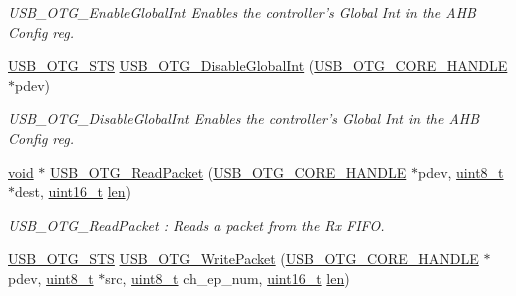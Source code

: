 \begin{DoxyCompactItemize}
\begin{DoxyCompactList}\small\item\em U\-S\-B\-\_\-\-O\-T\-G\-\_\-\-Enable\-Global\-Int Enables the controller's Global Int in the A\-H\-B Config reg. \end{DoxyCompactList}\item 
\hyperlink{group___u_s_b___c_o_r_e___exported___types_ga8b6504b9af0662f17515795db0f9c8ed}{U\-S\-B\-\_\-\-O\-T\-G\-\_\-\-S\-T\-S} \hyperlink{group___u_s_b___c_o_r_e___exported___functions_prototype_gaceb188e956d5f85d3e2ce0b8e735f613}{U\-S\-B\-\_\-\-O\-T\-G\-\_\-\-Disable\-Global\-Int} (\hyperlink{group___u_s_b___c_o_r_e___exported___types_gaf76054c11eb8a3367907aad7ae700e80}{U\-S\-B\-\_\-\-O\-T\-G\-\_\-\-C\-O\-R\-E\-\_\-\-H\-A\-N\-D\-L\-E} $\ast$pdev)
\begin{DoxyCompactList}\small\item\em U\-S\-B\-\_\-\-O\-T\-G\-\_\-\-Disable\-Global\-Int Enables the controller's Global Int in the A\-H\-B Config reg. \end{DoxyCompactList}\item 
\hyperlink{group___n_a_m_e_ga18028b8badbf1ea7e704ccac3c488e82}{void} $\ast$ \hyperlink{group___u_s_b___c_o_r_e___exported___functions_prototype_gaf79fc30f972ad9edfbd74fff2d12e759}{U\-S\-B\-\_\-\-O\-T\-G\-\_\-\-Read\-Packet} (\hyperlink{group___u_s_b___c_o_r_e___exported___types_gaf76054c11eb8a3367907aad7ae700e80}{U\-S\-B\-\_\-\-O\-T\-G\-\_\-\-C\-O\-R\-E\-\_\-\-H\-A\-N\-D\-L\-E} $\ast$pdev, \hyperlink{stdint_8h_aba7bc1797add20fe3efdf37ced1182c5}{uint8\-\_\-t} $\ast$dest, \hyperlink{stdint_8h_a273cf69d639a59973b6019625df33e30}{uint16\-\_\-t} \hyperlink{mavlink__helpers_8h_aba59486c1504340293255a065b546e3a}{len})
\begin{DoxyCompactList}\small\item\em U\-S\-B\-\_\-\-O\-T\-G\-\_\-\-Read\-Packet \-: Reads a packet from the Rx F\-I\-F\-O. \end{DoxyCompactList}\item 
\hyperlink{group___u_s_b___c_o_r_e___exported___types_ga8b6504b9af0662f17515795db0f9c8ed}{U\-S\-B\-\_\-\-O\-T\-G\-\_\-\-S\-T\-S} \hyperlink{group___u_s_b___c_o_r_e___exported___functions_prototype_gadbcc8ee006fb8abbcaf1718d47a2458a}{U\-S\-B\-\_\-\-O\-T\-G\-\_\-\-Write\-Packet} (\hyperlink{group___u_s_b___c_o_r_e___exported___types_gaf76054c11eb8a3367907aad7ae700e80}{U\-S\-B\-\_\-\-O\-T\-G\-\_\-\-C\-O\-R\-E\-\_\-\-H\-A\-N\-D\-L\-E} $\ast$pdev, \hyperlink{stdint_8h_aba7bc1797add20fe3efdf37ced1182c5}{uint8\-\_\-t} $\ast$src, \hyperlink{stdint_8h_aba7bc1797add20fe3efdf37ced1182c5}{uint8\-\_\-t} ch\-\_\-ep\-\_\-num, \hyperlink{stdint_8h_a273cf69d639a59973b6019625df33e30}{uint16\-\_\-t} \hyperlink{mavlink__helpers_8h_aba59486c1504340293255a065b546e3a}{len})

\end{DoxyCompactItemize}

